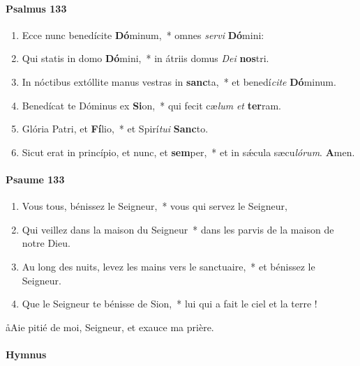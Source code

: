 \documentclass[twoside]{article}
\begin{document}
\begin{paracol}[1]{2}
\paragraph{Psalmus 133}
\begin{enumerate}[wide, itemsep=0mm, labelwidth=!, labelindent=0pt, label=\color{gregoriocolor}\theenumi]
\item Ecce nunc benedícite \textbf{Dó}minum,~* omnes \textit{ser}\textit{vi} \textbf{Dó}mini:
\item Qui statis in domo \textbf{Dó}mini,~* in átriis domus \textit{De}\textit{i} \textbf{nos}tri.
\item In nóctibus extóllite manus vestras in \textbf{sanc}ta,~* et benedí\textit{ci}\textit{te} \textbf{Dó}minum.
\item Benedícat te Dóminus ex \textbf{Si}on,~* qui fecit cæ\textit{lum} \textit{et} \textbf{ter}ram.
\item Glória Patri, et \textbf{Fí}lio,~* et Spirí\textit{tu}\textit{i} \textbf{Sanc}to.
\item Sicut erat in princípio, et nunc, et \textbf{sem}per,~* et in sǽcula sæcu\textit{ló}\textit{rum}. \textbf{A}men.
\end{enumerate}

\switchcolumn

\paragraph{Psaume 133}
\begin{enumerate}[wide, itemsep=0mm, labelwidth=!, labelindent=0pt, label=\color{gregoriocolor}\theenumi]
\item Vous tous, bénissez le Seigneur,~* vous qui servez le Seigneur,
\item Qui veillez dans la maison du Seigneur~* dans les parvis de la maison de notre Dieu.
\item Au long des nuits, levez les mains vers le sanctuaire,~* et bénissez le Seigneur.
\item Que le Seigneur te bénisse de Sion,~* lui qui a fait le ciel et la terre !
\end{enumerate}
\switchcolumn*

\switchcolumn
\aa Aie pitié de moi, Seigneur, et exauce ma prière.
\pagebreak
\switchcolumn*

\paragraph{Hymnus}


\end{paracol}
\end{document}
